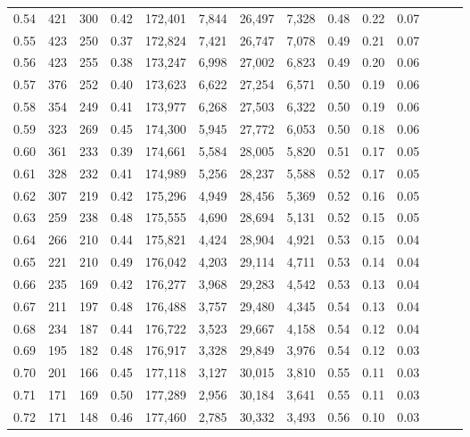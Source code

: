 \begin{tabular}{rrrrrrrrrrrrrr}
0.54 &    421 &  300 &  0.42 &  172,401 &    7,844 &  26,497 &   7,328 &  0.48 &  0.22 &      0.07 \\
0.55 &    423 &  250 &  0.37 &  172,824 &    7,421 &  26,747 &   7,078 &  0.49 &  0.21 &      0.07 \\
0.56 &    423 &  255 &  0.38 &  173,247 &    6,998 &  27,002 &   6,823 &  0.49 &  0.20 &      0.06 \\
0.57 &    376 &  252 &  0.40 &  173,623 &    6,622 &  27,254 &   6,571 &  0.50 &  0.19 &      0.06 \\
0.58 &    354 &  249 &  0.41 &  173,977 &    6,268 &  27,503 &   6,322 &  0.50 &  0.19 &      0.06 \\
0.59 &    323 &  269 &  0.45 &  174,300 &    5,945 &  27,772 &   6,053 &  0.50 &  0.18 &      0.06 \\
0.60 &    361 &  233 &  0.39 &  174,661 &    5,584 &  28,005 &   5,820 &  0.51 &  0.17 &      0.05 \\
0.61 &    328 &  232 &  0.41 &  174,989 &    5,256 &  28,237 &   5,588 &  0.52 &  0.17 &      0.05 \\
0.62 &    307 &  219 &  0.42 &  175,296 &    4,949 &  28,456 &   5,369 &  0.52 &  0.16 &      0.05 \\
0.63 &    259 &  238 &  0.48 &  175,555 &    4,690 &  28,694 &   5,131 &  0.52 &  0.15 &      0.05 \\
0.64 &    266 &  210 &  0.44 &  175,821 &    4,424 &  28,904 &   4,921 &  0.53 &  0.15 &      0.04 \\
0.65 &    221 &  210 &  0.49 &  176,042 &    4,203 &  29,114 &   4,711 &  0.53 &  0.14 &      0.04 \\
0.66 &    235 &  169 &  0.42 &  176,277 &    3,968 &  29,283 &   4,542 &  0.53 &  0.13 &      0.04 \\
0.67 &    211 &  197 &  0.48 &  176,488 &    3,757 &  29,480 &   4,345 &  0.54 &  0.13 &      0.04 \\
0.68 &    234 &  187 &  0.44 &  176,722 &    3,523 &  29,667 &   4,158 &  0.54 &  0.12 &      0.04 \\
0.69 &    195 &  182 &  0.48 &  176,917 &    3,328 &  29,849 &   3,976 &  0.54 &  0.12 &      0.03 \\
0.70 &    201 &  166 &  0.45 &  177,118 &    3,127 &  30,015 &   3,810 &  0.55 &  0.11 &      0.03 \\
0.71 &    171 &  169 &  0.50 &  177,289 &    2,956 &  30,184 &   3,641 &  0.55 &  0.11 &      0.03 \\
0.72 &    171 &  148 &  0.46 &  177,460 &    2,785 &  30,332 &   3,493 &  0.56 &  0.10 &      0.03 \\

\end{tabular}
